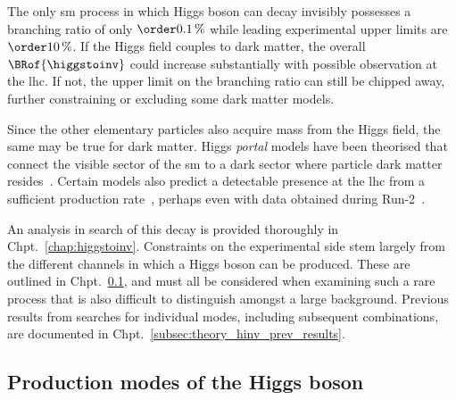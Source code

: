 The only \acrshort{sm} process in which Higgs boson can decay invisibly possesses a branching ratio of only $\order{\text{0.1\,\%}}$ while leading experimental upper limits are $\order{\text{10\,\%}}$. If the Higgs field couples to dark matter, the overall $\BRof{\higgstoinv}$ could increase substantially with possible observation at the \acrshort{lhc}. If not, the upper limit on the branching ratio can still be chipped away, further constraining or excluding some dark matter models. 

Since the other elementary particles also acquire mass from the Higgs field, the same may be true for dark matter. Higgs \emph{portal} models have been theorised that connect the visible sector of the \acrlong{sm} to a dark sector where particle dark matter resides~\cite{higgs_portal_singlet_dm,Arcadi:2019lka}. Certain models also predict a detectable presence at the \acrshort{lhc} from a sufficient production rate~\cite{Boveia:2018yeb}, perhaps even with data obtained during Run-2~\cite{Abercrombie:2015wmb}.


An analysis in search of this decay is provided thoroughly in Chpt.~\ref{chap:higgstoinv}. Constraints on the experimental side stem largely from the different channels in which a Higgs boson can be produced. These are outlined in Chpt.~\ref{subsec:theory_higgs_production_modes}, and must all be considered when examining such a rare process that is also difficult to distinguish amongst a large background. Previous results from searches for individual modes, including subsequent combinations, are documented in Chpt.~\ref{subsec:theory_hinv_prev_results}.




\subsection{Production modes of the Higgs boson}
\label{subsec:theory_higgs_production_modes}

